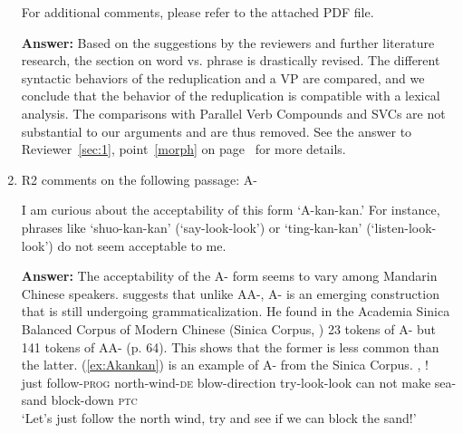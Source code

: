 \documentclass[fleqn,twoside]{article}
\begin{document}
\begin{enumerate}
For additional comments, please refer to the attached PDF file.

\textbf{Answer:}
Based on the suggestions by the reviewers and further literature research, the section on word vs. phrase is drastically revised.
The different syntactic behaviors of the reduplication and a VP are compared,
and we conclude that the behavior of the reduplication is compatible with a lexical analysis.
The comparisons with Parallel Verb Compounds and SVCs are not substantial to our arguments and are thus removed.
See the answer to Reviewer~\ref{sec:1}, point~\ref{morph} on page~\pageref{morph} for more details. 


\item
\begin{displayquote}
R2 comments on the following passage: A-
\end{displayquote}

I am curious about the acceptability of this form `A-kan-kan.' For instance, phrases like `shuo-kan-kan' (`say-look-look') or `ting-kan-kan' (`listen-look-look') do not seem acceptable to me. 

\textbf{Answer:}
The acceptability of the A- form seems to vary among Mandarin Chinese speakers.
\citet[73]{Cheng2012} suggests that unlike AA-, A- is an emerging construction that is still undergoing grammaticalization.
He found in the Academia Sinica Balanced Corpus of Modern Chinese (Sinica Corpus, \citealt{sinica}) 23 tokens of A- but 141 tokens of AA- (p. 64).
This shows that the former is less common than the latter.
(\ref{ex:Akankan}) is an example of A- from the Sinica Corpus.
\ea\label{ex:Akankan} %
\gll {}   ,       !\\
just follow-\textsc{prog} north-wind-\textsc{de} blow-direction try-look-look can not make sea-sand block-down \textsc{ptc}\\
\glt `Let's just follow the north wind, try and see if we can block the sand!'
\z 


\end{enumerate}
\end{document}
